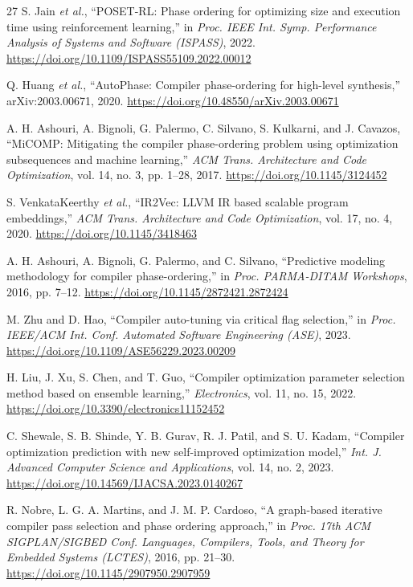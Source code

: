 \documentclass[conference,a4paper]{IEEEtran}
\begin{document}
\begin{thebibliography}{27}
S. Jain \textit{et al.},
``POSET-RL: Phase ordering for optimizing size and execution time using reinforcement learning,''
in \textit{Proc. IEEE Int. Symp. Performance Analysis of Systems and Software (ISPASS)}, 2022.
\url{https://doi.org/10.1109/ISPASS55109.2022.00012}

Q. Huang \textit{et al.},
``AutoPhase: Compiler phase-ordering for high-level synthesis,'' arXiv:2003.00671, 2020.
\url{https://doi.org/10.48550/arXiv.2003.00671}

A. H. Ashouri, A. Bignoli, G. Palermo, C. Silvano, S. Kulkarni, and J. Cavazos,
``MiCOMP: Mitigating the compiler phase-ordering problem using optimization subsequences and machine learning,''
\textit{ACM Trans. Architecture and Code Optimization}, vol. 14, no. 3, pp. 1--28, 2017.
\url{https://doi.org/10.1145/3124452}

S. VenkataKeerthy \textit{et al.},
``IR2Vec: LLVM IR based scalable program embeddings,''
\textit{ACM Trans. Architecture and Code Optimization}, vol. 17, no. 4, 2020.
\url{https://doi.org/10.1145/3418463}

A. H. Ashouri, A. Bignoli, G. Palermo, and C. Silvano,
``Predictive modeling methodology for compiler phase-ordering,''
in \textit{Proc. PARMA-DITAM Workshops}, 2016, pp. 7--12.
\url{https://doi.org/10.1145/2872421.2872424}

M. Zhu and D. Hao,
``Compiler auto-tuning via critical flag selection,''
in \textit{Proc. IEEE/ACM Int. Conf. Automated Software Engineering (ASE)}, 2023.
\url{https://doi.org/10.1109/ASE56229.2023.00209}

H. Liu, J. Xu, S. Chen, and T. Guo,
``Compiler optimization parameter selection method based on ensemble learning,''
\textit{Electronics}, vol. 11, no. 15, 2022.
\url{https://doi.org/10.3390/electronics11152452}

C. Shewale, S. B. Shinde, Y. B. Gurav, R. J. Patil, and S. U. Kadam,
``Compiler optimization prediction with new self-improved optimization model,''
\textit{Int. J. Advanced Computer Science and Applications}, vol. 14, no. 2, 2023.
\url{https://doi.org/10.14569/IJACSA.2023.0140267}

R. Nobre, L. G. A. Martins, and J. M. P. Cardoso,
``A graph-based iterative compiler pass selection and phase ordering approach,''
in \textit{Proc. 17th ACM SIGPLAN/SIGBED Conf. Languages, Compilers, Tools, and Theory for Embedded Systems (LCTES)}, 2016, pp. 21--30.
\url{https://doi.org/10.1145/2907950.2907959}


\end{thebibliography}
\end{document}
